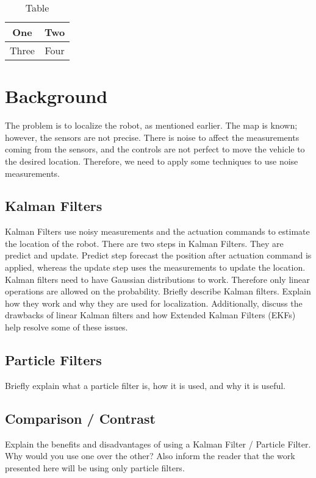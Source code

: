 \documentclass[10pt,journal,compsoc]{IEEEtran}
\begin{document}
\begin{table}[h]
\caption{Table}
\label{table_example}
\begin{center}
\begin{tabular}{|c||c|}
\hline
One & Two\\
\hline
Three & Four\\
\hline
\end{tabular}
\end{center}
\end{table}



\section{Background}
The problem is to localize the robot, as mentioned earlier. The map is known; however, the sensors are not precise. There is noise to affect the measurements coming from the sensors, and the controls are not perfect to move the vehicle to the desired location. Therefore, we need to apply some techniques to use noise measurements.\cite{lamport1994latex}

\subsection{Kalman Filters}
Kalman Filters use noisy measurements and the actuation commands to estimate the location of the robot. There are two steps in Kalman Filters. They are predict and update. Predict step forecast the position after actuation command is applied, whereas the update step uses the measurements to update the location.
Kalman filters need to have Gaussian distributions to work. Therefore only linear operations are allowed on the probability.
Briefly describe Kalman filters. Explain how they work and why they are used for localization. Additionally, discuss the drawbacks of linear Kalman filters and how Extended Kalman Filters (EKFs) help resolve some of these issues.\cite{wikipediaKF}

\subsection{Particle Filters}
Briefly explain what a particle filter is, how it is used, and why it is useful.

\subsection{Comparison / Contrast}
Explain the benefits and disadvantages of using a Kalman Filter / Particle Filter. Why would you use one over the other? Also inform the reader that the work presented here will be using only particle filters.
\end{document}
